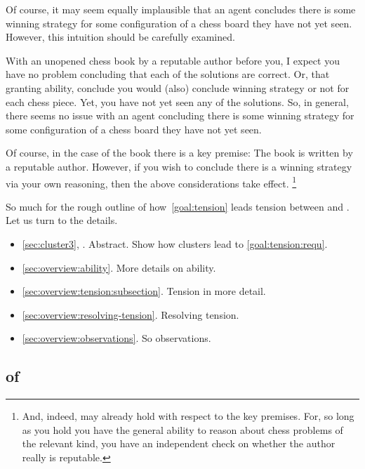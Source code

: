 \begin{note}[Ability]
  Of course, it may seem equally implausible that an agent concludes there is some winning strategy for some configuration of a chess board they have not yet seen.
  However, this intuition should be carefully examined.

  With an unopened chess book by a reputable author before you, I expect you have no problem concluding that each of the solutions are correct.
  {
    \color{red}
    Or, that granting ability, conclude you would (also) conclude winning strategy or not for each chess piece.
  }
  Yet, you have not yet seen any of the solutions.
  So, in general, there seems no issue with an agent concluding there is some winning strategy for some configuration of a chess board they have not yet seen.

  Of course, in the case of the book there is a key premise:
  The book is written by a reputable author.
  However, if you wish to conclude there is a winning strategy via your own reasoning, then the above considerations take effect.%
  \footnote{
    And, indeed, may already hold with respect to the key premises.
    For, so long as you hold you have the general ability to reason about chess problems of the relevant kind, you have an independent check on whether the author really is reputable.
  }
\end{note}

\begin{note}[Moving on]
  So much for the rough outline of how~\autoref{goal:tension} leads tension between \csN{} and \ESU{}.
  Let us turn to the details.

  {
    \color{red}
    \begin{itemize}
    \item
      \autoref{sec:cluster3}, .
      Abstract.
      Show how clusters lead to \ref{goal:tension:requ}.
    \item
      \autoref{sec:overview:ability}.
      More details on ability.
    \item
      \autoref{sec:overview:tension:subsection}.
      Tension in more detail.
    \item
      \autoref{sec:overview:resolving-tension}.
      Resolving tension.
    \item
      \autoref{sec:overview:observations}.
      So observations.
    \end{itemize}
  }
\end{note}

\subsection{ of }
\label{sec:cluster3}

